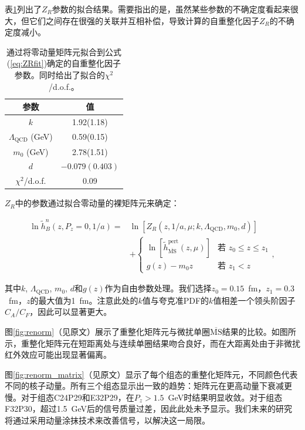 \documentclass[12pt,a4paper]{ctexart}
\begin{document}
表\ref{tab:ZRparams}列出了$Z_R$参数的拟合结果。需要指出的是，虽然某些参数的不确定度看起来很大，但它们之间存在很强的关联并互相补偿，导致计算的自重整化因子$Z_R$的不确定度减小。

\begin{table}[H]
\centering
\caption{通过将零动量矩阵元拟合到公式(\ref{eq:ZRfit})确定的自重整化因子参数。同时给出了拟合的$\chi^2$/d.o.f.。}
\label{tab:ZRparams}
\begin{tabular}{cc}
\toprule
参数 & 值 \\
\midrule
$k$ & 1.92(1.18) \\
$\Lambda_{\text{QCD}}$ (GeV) & 0.59(0.15) \\
$m_0$ (GeV) & 2.78(1.51) \\
$d$ & $-0.079(0.403)$ \\
$\chi^2$/d.o.f. & 0.09 \\
\bottomrule
\end{tabular}
\end{table}

$Z_R$中的参数通过拟合零动量的裸矩阵元来确定：

\begin{equation}
\begin{aligned}
\ln\tilde{h}^n_B(z, P_z=0, 1/a) = &\ln[Z_R(z, 1/a, \mu; k, \Lambda_{\text{QCD}}, m_0, d)] \\
&+ \begin{cases}
\ln\left[\tilde{h}^{\text{pert}}_{\overline{\text{MS}}}(z, \mu)\right] & \text{若 } z_0 \leq z \leq z_1 \\[5pt]
g(z) - m_0 z & \text{若 } z_1 < z
\end{cases},
\end{aligned}
\label{eq:ZRfit}
\end{equation}

其中$k$, $\Lambda_{\text{QCD}}$, $m_0$, $d$和$g(z)$作为自由参数处理。我们选择$z_0 = 0.15$~fm，$z_1 = 0.3$~fm，$z$的最大值为1~fm。注意此处的$k$值与夸克准PDF的$k$值相差一个领头阶因子$C_A/C_F$，因此可以显著更大。

图\ref{fig:renorm}（见原文）展示了重整化矩阵元与微扰单圈$\overline{\text{MS}}$结果的比较。如图所示，重整化矩阵元在短距离处与连续单圈结果吻合良好，而在大距离处由于非微扰红外效应可能出现显著偏离。

图\ref{fig:renorm_matrix}（见原文）显示了每个组态的重整化矩阵元，不同颜色代表不同的核子动量。所有三个组态显示出一致的趋势：矩阵元在更高动量下衰减更慢。对于组态C24P29和E32P29，在$P_z > 1.5$~GeV时结果明显收敛。对于组态F32P30，超过1.5~GeV后的信号质量过差，因此此处未予显示。我们未来的研究将通过采用动量涂抹技术来改善信号，以解决这一局限。
\end{document}
